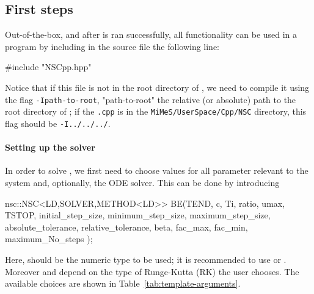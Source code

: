 \documentclass[11pt,a4paper]{article}
\begin{document}
\subsection{First steps}\label{sec:First_examples} 
%
Out-of-the-box, and after  is ran successfully, all \nsc functionality can be used in a \CPP program by including in the source file the following line:
%
\begin{cpp}
	#include "NSCpp.hpp"
\end{cpp}
%
Notice that if this file is not in the root directory of \nsc, we need to compile it using the flag {\tt -Ipath-to-root}, "path-to-root" the relative (or absolute) path to the root directory of \nsc; \eg if the {\tt .cpp} is in the {\tt MiMeS/UserSpace/Cpp/NSC} directory, this flag should be {\tt -I../../../}. 


\paragraph{Setting up the solver}
%
In order to solve , we first need to choose values for all parameter relevant to the system and, optionally, the ODE solver. This can be done by introducing
%
\begin{cpp}
    nsc::NSC<LD,SOLVER,METHOD<LD>> BE(TEND, c, Ti, ratio, umax, TSTOP,
														initial_step_size, minimum_step_size, 
														maximum_step_size, absolute_tolerance, 
														relative_tolerance, beta, fac_max, 
														fac_min, maximum_No_steps
														);
\end{cpp}
%
Here,  should be the numeric type to be used; it is recommended to use  or . Moreover  and  depend on the type of Runge-Kutta (RK) the user chooses. The available choices are shown in Table~\ref{tab:template-arguments}. 
\end{document}
